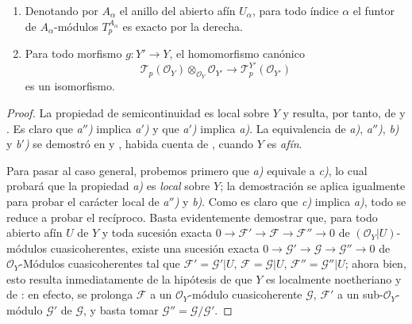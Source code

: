 \begin{theorem}[7.7.5]
\begin{enumerate}
  \item[\textup{c)}] Denotando por $A_\alpha$ el anillo del abierto afín $U_\alpha$,
    para todo índice $\alpha$ el funtor de $A_\alpha$-módulos
    $T_p^{A_\alpha}$ es exacto por la derecha.

  \item[\textup{d)}] Para todo morfismo $g:Y'\to Y$, el homomorfismo canónico
    \[
      \mathscr T_p(\mathscr O_Y)
      \otimes_{\mathscr O_Y}\mathscr O_{Y'}
      \longrightarrow
      \mathscr T_p^{Y'}(\mathscr O_{Y'})
      \tag{7.7.5.3}\label{III.7.7.5.3.fr}
    \]
    es un isomorfismo.
\end{enumerate}
\end{theorem}

\begin{proof}
La propiedad de semicontinuidad es local sobre $Y$ y resulta, por tanto, de
 y . Es claro que \emph{a$''$)} implica \emph{a$'$)} y que
\emph{a$'$)} implica \emph{a)}. La equivalencia de \emph{a)}, \emph{a$''$)}, \emph{b)} y \emph{b$'$)} se demostró en
 y , habida cuenta de
, cuando $Y$ es \emph{afín}.

Para pasar al caso general, probemos primero que \emph{a)} equivale a \emph{c)}, lo cual
probará que la propiedad \emph{a)} es \emph{local} sobre $Y$; la demostración se aplica
igualmente para probar el carácter local de \emph{a$''$)} y \emph{b)}. Como es claro que \emph{c)}
implica \emph{a)}, todo se reduce a probar el recíproco. Basta evidentemente demostrar
que, para todo abierto afín $U$ de $Y$ y toda sucesión exacta
$0\longrightarrow\mathscr F'\longrightarrow\mathscr F\longrightarrow\mathscr F''\longrightarrow0$
de $(\mathscr O_Y|U)$-módulos cuasicoherentes, existe una sucesión exacta
$0\longrightarrow\mathscr G'\longrightarrow\mathscr G\longrightarrow\mathscr G''\longrightarrow0$
de $\mathscr O_Y$-Módulos cuasicoherentes tal que
$\mathscr F'=\mathscr G'|U$, $\mathscr F=\mathscr G|U$, $\mathscr F''=\mathscr G''|U$;
ahora bien, esto resulta inmediatamente de la hipótesis de que $Y$ es
localmente noetheriano y de : en efecto, se prolonga
$\mathscr F$ a un $\mathscr O_Y$-módulo cuasicoherente $\mathscr G$,
$\mathscr F'$ a un sub-$\mathscr O_Y$-módulo $\mathscr G'$ de $\mathscr G$, y
basta tomar $\mathscr G''=\mathscr G/\mathscr G'$.


\end{proof}
